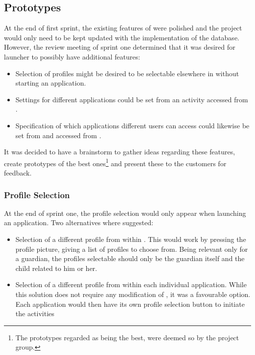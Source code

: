 \subsection{Prototypes}\label{sec:sprint2:prototypes}

At the end of first sprint, the existing features of \launcher were polished and the project would only need to be kept updated with the implementation of the database. 
However, the review meeting of sprint one determined that it was desired for launcher to possibly have additional features:

\begin{itemize}
\item Selection of profiles might be desired to be selectable elsewhere in \launcher without starting an application.
\item Settings for different applications could be set from an activity accessed from \launcher.
\item Specification of which applications different users can access could likewise be set from and accessed from \launcher.
\end{itemize}

It was decided to have a brainstorm to gather ideas regarding these features, create prototypes of the best ones\footnote{The prototypes regarded as being the best, were deemed so by the project group.} and present these to the customers for feedback.

\subsubsection{Profile Selection}

At the end of sprint one, the profile selection would only appear when launching an application.
Two alternatives where suggested:

\begin{itemize}
\item Selection of a different profile from within \launcher.
This would work by pressing the profile picture, giving a list of profiles to choose from.
Being relevant only for a guardian, the profiles selectable should only be the guardian itself and the child related to him or her.

\item Selection of a different profile from within each individual application.
While this solution does not require any modification of \launcher, it was a favourable option.
Each application would then have its own profile selection button to initiate the activities
\end{itemize}

